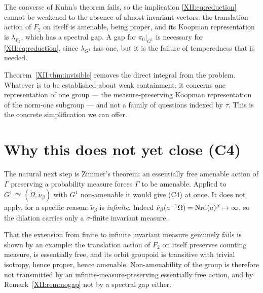\begin{remark}\label{XII:rem:nogap}
The converse of Kuhn's theorem fails, so the implication \eqref{XII:eq:reduction} cannot be
weakened to the absence of almost invariant vectors: the translation action of $F_2$ on itself
is amenable, being proper, and its Koopman representation is $\lambda_{F_2}$, which has a
spectral gap. A gap for $\pi_0|_{G^1}$ is necessary for \eqref{XII:eq:reduction}, since
$\lambda_{G^1}$ has one, but it is the failure of temperedness that is needed.
\end{remark}

\begin{remark}\label{XII:rem:onerep}
Theorem~\ref{XII:thm:invisible} removes the direct integral from the problem. Whatever is to be
established about weak containment, it concerns one representation of one group --- the
measure-preserving Koopman representation of the norm-one subgroup --- and not a family of
questions indexed by $\tau$. This is the concrete simplification we can offer.
\end{remark}

\section{Why this does not yet close (C4)}

\begin{remark}\label{XII:rem:zimmer}
The natural next step is Zimmer's theorem: an essentially free amenable action of $\Gamma$
preserving a probability measure forces $\Gamma$ to be amenable. Applied to
$G^1\curvearrowright(\widetilde\Omega,\tilde\nu_\beta)$ with $G^1$ non-amenable it would give
(C4) at once. It does not apply, for a specific reason: $\tilde\nu_\beta$ is
\emph{infinite}. Indeed $\tilde\nu_\beta(a^{-1}\Omega)=\operatorname{Nrd}(a)^{\beta}\to\infty$, so the
dilation carries only a $\sigma$-finite invariant measure.

That the extension from finite to infinite invariant measure genuinely fails is shown by an
example: the translation action of $F_2$ on itself preserves counting measure, is essentially
free, and its orbit groupoid is transitive with trivial isotropy, hence proper, hence
amenable. Non-amenability of the group is therefore not transmitted by an
infinite-measure-preserving essentially free action, and by Remark~\ref{XII:rem:nogap} not by a
spectral gap either.
\end{remark}

